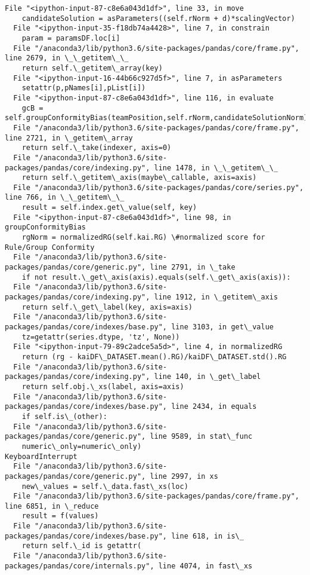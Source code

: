\documentclass[11pt]{article}
\begin{document}
\begin{Verbatim}[commandchars=\\\{\}]
  File "<ipython-input-87-c8e6a043d1df>", line 33, in move
    candidateSolution = asParameters((self.rNorm + d)*scalingVector)
  File "<ipython-input-35-f18db74a4428>", line 7, in constrain
    param = paramsDF.loc[i]
  File "/anaconda3/lib/python3.6/site-packages/pandas/core/frame.py", line 2679, in \_\_getitem\_\_
    return self.\_getitem\_array(key)
  File "<ipython-input-16-44b66c927d5f>", line 7, in asParameters
    setattr(p,pNames[i],pList[i])
  File "<ipython-input-87-c8e6a043d1df>", line 116, in evaluate
    gcB = self.groupConformityBias(teamPosition,self.rNorm,candidateSolutionNorm)
  File "/anaconda3/lib/python3.6/site-packages/pandas/core/frame.py", line 2721, in \_getitem\_array
    return self.\_take(indexer, axis=0)
  File "/anaconda3/lib/python3.6/site-packages/pandas/core/indexing.py", line 1478, in \_\_getitem\_\_
    return self.\_getitem\_axis(maybe\_callable, axis=axis)
  File "/anaconda3/lib/python3.6/site-packages/pandas/core/series.py", line 766, in \_\_getitem\_\_
    result = self.index.get\_value(self, key)
  File "<ipython-input-87-c8e6a043d1df>", line 98, in groupConformityBias
    rgNorm = normalizedRG(self.kai.RG) \#normalized score for Rule/Group Conformity
  File "/anaconda3/lib/python3.6/site-packages/pandas/core/generic.py", line 2791, in \_take
    if not result.\_get\_axis(axis).equals(self.\_get\_axis(axis)):
  File "/anaconda3/lib/python3.6/site-packages/pandas/core/indexing.py", line 1912, in \_getitem\_axis
    return self.\_get\_label(key, axis=axis)
  File "/anaconda3/lib/python3.6/site-packages/pandas/core/indexes/base.py", line 3103, in get\_value
    tz=getattr(series.dtype, 'tz', None))
  File "<ipython-input-79-89c2adce5a5d>", line 4, in normalizedRG
    return (rg - kaiDF\_DATASET.mean().RG)/kaiDF\_DATASET.std().RG
  File "/anaconda3/lib/python3.6/site-packages/pandas/core/indexing.py", line 140, in \_get\_label
    return self.obj.\_xs(label, axis=axis)
  File "/anaconda3/lib/python3.6/site-packages/pandas/core/indexes/base.py", line 2434, in equals
    if self.is\_(other):
  File "/anaconda3/lib/python3.6/site-packages/pandas/core/generic.py", line 9589, in stat\_func
    numeric\_only=numeric\_only)
KeyboardInterrupt
  File "/anaconda3/lib/python3.6/site-packages/pandas/core/generic.py", line 2997, in xs
    new\_values = self.\_data.fast\_xs(loc)
  File "/anaconda3/lib/python3.6/site-packages/pandas/core/frame.py", line 6851, in \_reduce
    result = f(values)
  File "/anaconda3/lib/python3.6/site-packages/pandas/core/indexes/base.py", line 618, in is\_
    return self.\_id is getattr(
  File "/anaconda3/lib/python3.6/site-packages/pandas/core/internals.py", line 4074, in fast\_xs

\end{Verbatim}
\end{document}
